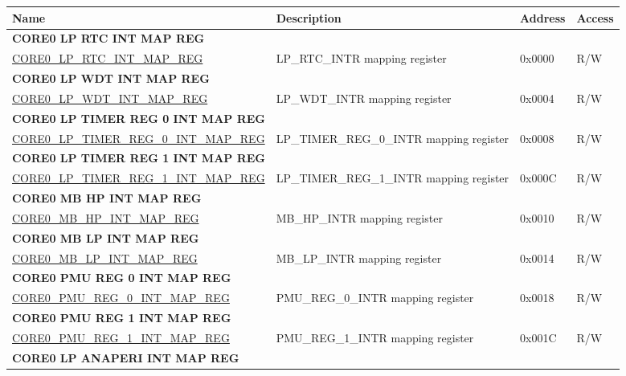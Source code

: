 \begin{longtable}{ | p{7.5cm} | p{7.2cm} | p{1.3cm} | p{1cm} | }
\hline\rowcolor{lightgray}
Name & Description &  Address & Access \\ \hline
\endhead
\multicolumn{4}{|l|}{\textbf{CORE0 LP RTC INT MAP REG}} \\ \hline
\hyperref[regdesc:CORE0LPRTCINTMAPREG]{CORE0\_LP\_RTC\_INT\_MAP\_REG} & LP\_RTC\_INTR mapping register & 0x0000 & R/W \\ \hline
\multicolumn{4}{|l|}{\textbf{CORE0 LP WDT INT MAP REG}} \\ \hline
\hyperref[regdesc:CORE0LPWDTINTMAPREG]{CORE0\_LP\_WDT\_INT\_MAP\_REG} & LP\_WDT\_INTR mapping register & 0x0004 & R/W \\ \hline
\multicolumn{4}{|l|}{\textbf{CORE0 LP TIMER REG 0 INT MAP REG}} \\ \hline
\hyperref[regdesc:CORE0LPTIMERREG0INTMAPREG]{CORE0\_LP\_TIMER\_REG\_0\_INT\_MAP\_REG} & LP\_TIMER\_REG\_0\_INTR mapping register & 0x0008 & R/W \\ \hline
\multicolumn{4}{|l|}{\textbf{CORE0 LP TIMER REG 1 INT MAP REG}} \\ \hline
\hyperref[regdesc:CORE0LPTIMERREG1INTMAPREG]{CORE0\_LP\_TIMER\_REG\_1\_INT\_MAP\_REG} & LP\_TIMER\_REG\_1\_INTR mapping register & 0x000C & R/W \\ \hline
\multicolumn{4}{|l|}{\textbf{CORE0 MB HP INT MAP REG}} \\ \hline
\hyperref[regdesc:CORE0MBHPINTMAPREG]{CORE0\_MB\_HP\_INT\_MAP\_REG} & MB\_HP\_INTR mapping register & 0x0010 & R/W \\ \hline
\multicolumn{4}{|l|}{\textbf{CORE0 MB LP INT MAP REG}} \\ \hline
\hyperref[regdesc:CORE0MBLPINTMAPREG]{CORE0\_MB\_LP\_INT\_MAP\_REG} & MB\_LP\_INTR mapping register & 0x0014 & R/W \\ \hline
\multicolumn{4}{|l|}{\textbf{CORE0 PMU REG 0 INT MAP REG}} \\ \hline
\hyperref[regdesc:CORE0PMUREG0INTMAPREG]{CORE0\_PMU\_REG\_0\_INT\_MAP\_REG} & PMU\_REG\_0\_INTR mapping register & 0x0018 & R/W \\ \hline
\multicolumn{4}{|l|}{\textbf{CORE0 PMU REG 1 INT MAP REG}} \\ \hline
\hyperref[regdesc:CORE0PMUREG1INTMAPREG]{CORE0\_PMU\_REG\_1\_INT\_MAP\_REG} & PMU\_REG\_1\_INTR mapping register & 0x001C & R/W \\ \hline
\multicolumn{4}{|l|}{\textbf{CORE0 LP ANAPERI INT MAP REG}} \\ \hline

\end{longtable}

